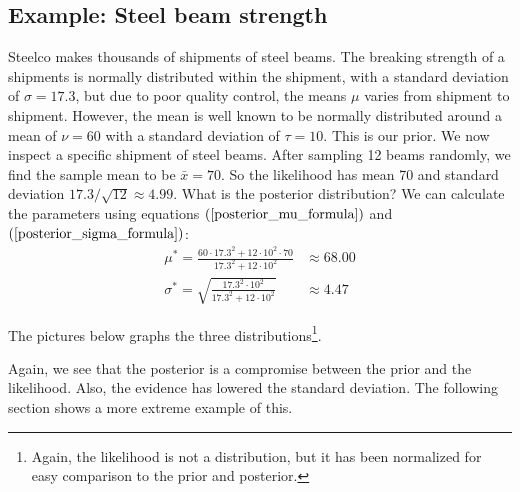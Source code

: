 \documentclass[12pt, a4paper]{article}
\begin{document}
\subsection{Example: Steel beam strength}
Steelco makes thousands of shipments of steel beams. The breaking strength of a shipments is normally distributed within the shipment, with a standard deviation of $\sigma=17.3$, but due to poor quality control, the means $\mu$ varies from shipment to shipment. However, the mean is well known to be normally distributed around a mean of $\nu=60$ with a standard deviation of $\tau=10$. This is our prior. We now inspect a specific shipment of steel beams. After sampling 12 beams randomly, we find the sample mean to be $\bar{x}=70$. So the likelihood has mean 70 and standard deviation $17.3/\sqrt{12}\approx 4.99$. What is the posterior distribution? We can calculate the parameters using equations $(\ref{posterior_mu_formula})$ and $(\ref{posterior_sigma_formula})$:
\begin{align}
\mu^*=\frac{60\cdot 17.3^2+12\cdot 10^2\cdot 70}{17.3^2+12\cdot 10^2}&\approx 68.00\\
\sigma^*=\sqrt{\frac{17.3^2\cdot 10^2}{17.3^2+12\cdot 10^2}}&\approx 4.47
\end{align}

The pictures below graphs the three distributions\footnote{Again, the likelihood is not a distribution, but it has been normalized for easy comparison to the prior and posterior.}.


Again, we see that the posterior is a compromise between the prior and the likelihood. Also, the evidence has lowered the standard deviation. The following section shows a more extreme example of this.
\end{document}
